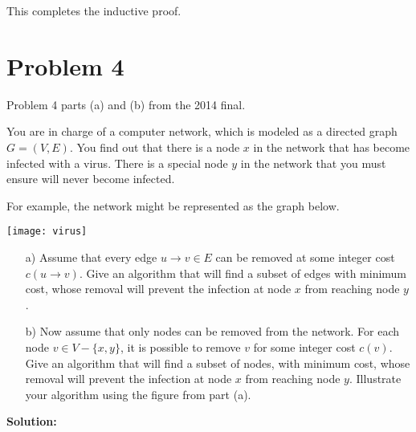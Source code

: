 \documentclass[a4paper, 11pt]{article}
\newcommand{\solution}{\textbf{Solution:}}
\begin{document}
This completes the inductive proof. 

\section*{Problem 4}

Problem 4 parts (a) and (b) from the 2014 final.

You are in charge of a computer network, which is modeled as a directed graph $G = (V, E)$.
You find out that there is a node $x$ in the network that has become infected with a virus.
There is a special node $y$ in the network that you must ensure will never become infected.

For example, the network might be represented as the graph below.

\begin{center}
	\texttt{[image: virus]}
\end{center}

\begin{itemize}
	\item [a)] Assume that every edge $u \rightarrow v \in E$ can be removed at some integer cost $c(u \rightarrow v)$. Give an algorithm that will find a subset of edges with minimum cost, whose removal will prevent the infection at node $x$ from reaching node $y$.
	\item [b)] Now assume that only nodes can be removed from the network. For each node $v \in V - \{x, y\}$, it is possible to remove $v$ for some integer cost $c(v)$. Give an algorithm that will find a subset of nodes, with minimum cost, whose removal will prevent the infection at node $x$ from reaching node $y$. Illustrate your algorithm using the figure from part (a).
\end{itemize}

\solution
\end{document}
